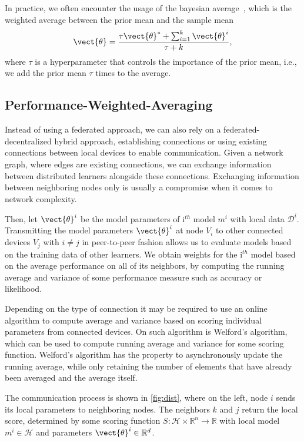 In practice, we often encounter the usage of the bayesian average~\cite{de2011bayesian}, which is the weighted average between the prior mean and the sample mean
\begin{equation}
    \vect{\theta} = \frac{\tau \vect{\theta}^* + \sum_{i=1}^k \vect{\theta}^i}{\tau + k},
\end{equation}
where $\tau$ is a hyperparameter that controls the importance of the prior mean, i.e., we add the prior mean $\tau$ times to the average. 

\subsection{Performance-Weighted-Averaging}

Instead of using a federated approach, we can also rely on a federated-decentralized hybrid approach, establishing connections or using existing connections between local devices to enable communication.
Given a network graph, where edges are existing connections, we can exchange information between distributed learners alongside these connections.
Exchanging information between neighboring nodes only is usually a compromise when it comes to network complexity.

Then, let $\vect{\theta}^{i}$ be the model parameters of i$^{th}$ model $m^{i}$ with local data $\mathcal{D}^{i}$.
Transmitting the model parameters $\vect{\theta}^{i}$  at node $V_i$  to other connected devices  $V_j$ with $i \neq j$ in peer-to-peer fashion allows us to evaluate models based on the training data of other learners.
We obtain weights for the i$^{th}$ model based on the average performance on all of its neighbors, by computing the running average and variance of some performance measure such as accuracy or likelihood.

Depending on the type of connection it may be required to use an online algorithm to compute average and variance based on scoring individual parameters from connected devices.
On such algorithm is Welford's algorithm, which can be used to compute running average and variance for some scoring function.
Welford's algorithm has the property to asynchronously update the running average, while only retaining the number of elements that have already been averaged and the average itself.

The communication process is shown in \fig \ref{fig:dist}, where on the left, node $i$ sends its local parameters to neighboring nodes. The neighbors $k$ and $j$ return the local score, determined by some scoring function $S: \mathcal{H} \times \mathbb{R}^n \rightarrow \mathbb{R}$ with local model $m^{i} \in \mathcal{H}$ and parameters $\vect{\theta}^{i} \in \mathbb{R}^d$.

